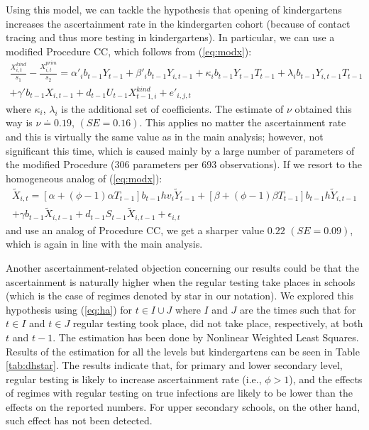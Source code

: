 \documentclass[fleqn,10pt]{wlscirep}
\begin{document}
Using this model, we can tackle the hypothesis that opening of kindergartens increases the ascertainment rate in the kindergarten cohort (because of contact tracing and thus more testing in kindergartens). In particular, we can use a modified Procedure CC, which follows from (\ref{eq:modx}): 
\begin{multline*}
\frac{X^{kind}_{i,t}}{s_{1}} - \frac{X^{prim}_{i,t}}{s_{2}}
=
\alpha'_i b_{t-1} Y_{t-1} + \beta'_i b_{t-1} Y_{i,t-1} + \kappa_i b_{t-1} Y_{t-1} T_{t-1} + \lambda_i b_{t-1} Y_{i,t-1} T_{t-1}\\
+ \gamma' b_{t-1} X_{i,t-1}  + d_{t-1}U_{t-1} X^{kind}_{t-1,i} + e'_{i,j,t}
\end{multline*}
where $\kappa_i$, $\lambda_i$ is the additional set of coefficients. The estimate of $\nu$ obtained this way is $\nu \doteq 0.19$, $(SE=0.16)$. This applies no matter the ascertainment rate and this is virtually the same value as in the main analysis; however, not significant this time, which is caused mainly by a large number of parameters of the modified Procedure (306 parameters per 693 observations). If we resort to the homogeneous analog of (\ref{eq:modx}):
\begin{multline}
\tilde X_{i,t} 
=
[\alpha + (\phi-1)\alpha T_{t-1}]  b_{t-1} h v_i \tilde Y_{t-1} + [\beta + (\phi-1)\beta T_{t-1}] b_{t-1} h \tilde Y_{i,t-1} \\ + 
 \gamma b_{t-1} \tilde X_{i,t-1}
+ d_{t-1} S_{t-1} \tilde X_{i,t-1} + \epsilon_{i,t}
\label{eq:ha}
\end{multline}
and use an analog of Procedure CC, we get a sharper value $0.22$ $(SE=0.09)$, which is again in line with the main analysis.

Another ascertainment-related objection concerning our results could be that the ascertainment is naturally higher when the regular testing take places in schools (which is the case of regimes denoted by star in our notation). We explored this hypothesis using (\ref{eq:ha}) for $t\in I \cup J$ where $I$ and $J$ are the times such that for $t\in I$ and $t\in J$ regular testing took place, did not take place, respectively, at both $t$ and $t-1$. The estimation has been done by Nonlinear Weighted Least Squares. Results of the estimation for all the levels but kindergartens can be seen in Table \ref{tab:dhstar}. The results indicate that, for primary and lower secondary level, regular testing is likely to increase ascertainment rate (i.e., $\phi > 1$), and the effects of regimes with regular testing on true infections are likely to be lower than the effects on the reported numbers. For upper secondary schools, on the other hand, such effect has not been detected.
\end{document}
